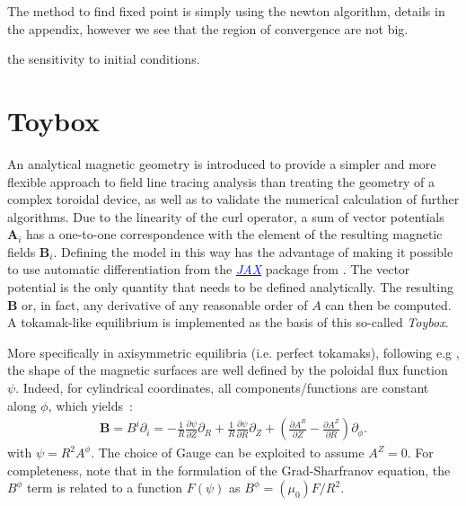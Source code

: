 The method to find fixed point is simply using the newton algorithm, details in the appendix, however we see that the region of convergence are not big.

\begin{figure}[H]
    \hfill
    \caption{}
\end{figure}

the sensitivity to initial conditions.

\chapter{Toybox}
An analytical magnetic geometry is introduced to provide a simpler and more flexible approach to field line tracing analysis than treating the geometry of a complex toroidal device, as well as to validate the numerical calculation of further algorithms. Due to the linearity of the curl operator, a sum of vector potentials $\textbf{A}_i$ has a one-to-one correspondence with the element of the resulting magnetic fields $\textbf{B}_i$. Defining the model in this way has the advantage of making it possible to use automatic differentiation from the 
\href{https://jax.readthedocs.io/en/latest/index.html}{\textcolor{blue}{\textit{JAX}}}
package from \cite{bradbury_jax_2018}. The vector potential is the only quantity that needs to be defined analytically. The resulting $\textbf{B}$ or, in fact, any derivative of any reasonable order of $A$ can then be computed. A tokamak-like equilibrium is implemented as the basis of this so-called \textit{Toybox}.

More specifically in axisymmetric equilibria (i.e. perfect tokamaks), following e.g \cite[p.108]{wesson_tokamaks_2011}, the shape of the magnetic surfaces are well defined by the poloidal flux function $\psi$. Indeed, for cylindrical coordinates, all components/functions are constant along $\phi$, which yields~:
\begin{align*}
    \textbf{B} = B^i\partial_i = -\frac{1}{R}\frac{\partial\psi}{\partial Z}\partial_R +\frac{1}{R}\frac{\partial\psi}{\partial R}\partial_Z + \left(\frac{\partial A^R}{\partial Z} - \frac{\partial A^Z}{\partial R}\right)\partial_\phi.
\end{align*}
with $\psi = R^2 A^\phi$. The choice of Gauge can be exploited to assume $A^Z = 0$. For completeness, note that in the formulation of the Grad-Sharfranov equation, the $B^\phi$ term is related to a function $F(\psi)$ as $B^\phi = (\mu_0) F/R^2$.

